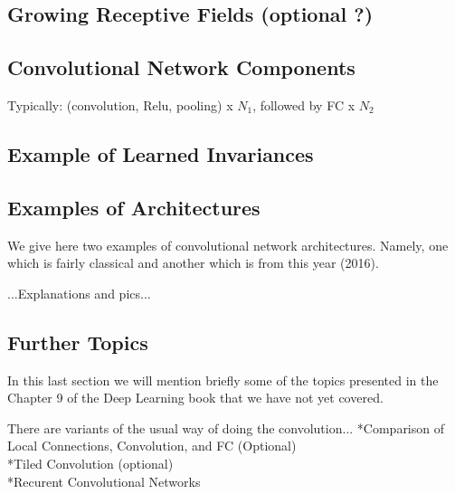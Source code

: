 \documentclass[]{article}
\begin{document}
\subsection{Growing Receptive Fields (optional ?)}

\subsection{Convolutional Network Components}
Typically: (convolution, Relu, pooling) x $N_1$, followed by FC x $N_2$


\subsection{Example of Learned Invariances}


\subsection{Examples of Architectures}
We give here two examples of convolutional network architectures. Namely, one
which is fairly classical and another which is from this year (2016).

...Explanations and pics...

\subsection{Further Topics}
In this last section we will mention briefly some of the topics presented in the
Chapter 9 of the Deep Learning book that we have not yet covered.

There are variants of the usual way of doing the convolution...
\newline
*Comparison of Local Connections, Convolution, and FC (Optional)\\
*Tiled Convolution (optional)\\
*Recurent Convolutional Networks

\end{document}
